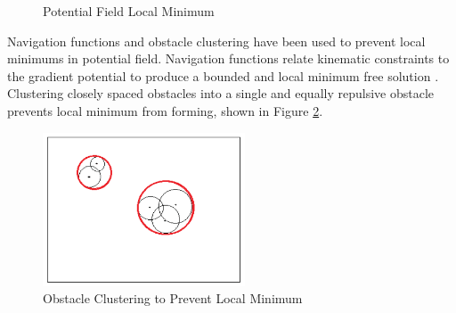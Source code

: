 \documentclass[numbered,pdftex]{ohio-etd}
\begin{document}
\begin{figure}[H]
	\begin{subfigmatrix}{2}%
		\centering
	\end{subfigmatrix}
	\caption{Potential Field Local Minimum \cite{liu_virtual-waypoint_2016}}
	\label{fig:vff}
\end{figure}

Navigation functions \cite{goerzen_survey_2010} and obstacle clustering \cite{liu_virtual-waypoint_2016} have been used to prevent local minimums in potential field. Navigation functions relate kinematic constraints to the gradient potential to produce a bounded and local minimum free solution \cite{rimon_exact_1992}. Clustering closely spaced obstacles into a single and equally repulsive obstacle prevents local minimum from forming, shown in Figure \ref{fig:obstacleclustering}.  

\begin{figure}[H]
	\centering
	\includegraphics[width=6cm]{PaperFigures/obstacleClustering}
	\caption{Obstacle Clustering to Prevent Local Minimum \cite{liu_virtual-waypoint_2016}}
	\label{fig:obstacleclustering}
\end{figure}
\end{document}
